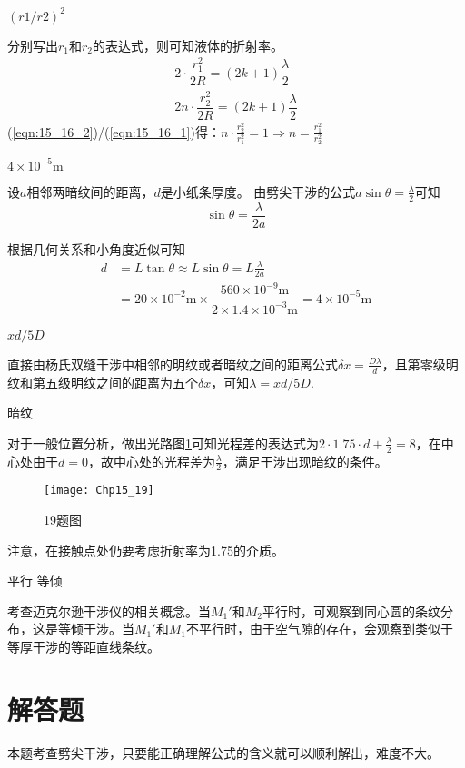 \exercise $(r1/r2)^2$

\solve 分别写出$r_1$和$r_2$的表达式，则可知液体的折射率。
\begin{gather}
	2\cdot\dfrac{r_1^2}{2R}=(2k+1)\dfrac{\lambda}{2}\label{eqn:15_16_1}\\
	2n\cdot\dfrac{r_2^2}{2R}=(2k+1)\dfrac{\lambda}{2}\label{eqn:15_16_2}
\end{gather}
(\ref{eqn:15_16_2})/(\ref{eqn:15_16_1})得：$n\cdot\frac{r_2^2}{r_1^2}=1\Rightarrow n=\frac{r_1^2}{r_2^2}$


\exercise $4\times10^{-5}\mathrm{m}$

\solve 设$a$相邻两暗纹间的距离，$d$是小纸条厚度。
由劈尖干涉的公式$a\sin\theta=\frac{\lambda}{2}$可知
\[
\sin\theta=\frac{\lambda}{2a}
\]

根据几何关系和小角度近似可知
\begin{align*}
d&=L\tan\theta\approx L\sin\theta=L\frac{\lambda}{2a}\\
&=20\times 10^{-2}\mathrm{m}\times \dfrac{560\times 10^{-9}\mathrm{m}}{2\times 1.4\times 10^{-3}\mathrm{m}}=4\times 10^{-5}\mathrm{m}
\end{align*}

\exercise $xd/5D$

\solve 直接由杨氏双缝干涉中相邻的明纹或者暗纹之间的距离公式$\delta x=\frac{D\lambda}{d}$，且第零级明纹和第五级明纹之间的距离为五个$\delta x$，可知$\lambda=xd/5D$.

\exercise 暗纹

\solve 对于一般位置分析，做出光路图\ref{fig:15_19}可知光程差的表达式为$2\cdot 1.75\cdot d+\frac{\lambda}{2}=8$，在中心处由于$d=0$，故中心处的光程差为$\frac{\lambda}{2}$，满足干涉出现暗纹的条件。
\begin{figure}[!h]
	\centering
	\texttt{[image: Chp15\_19]}
	\caption{19题图}\label{fig:15_19}
\end{figure}

注意，在接触点处仍要考虑折射率为1.75的介质。

\exercise 平行 等倾

\solve 考查迈克尔逊干涉仪的相关概念。当$M_1'$和$M_2$平行时，可观察到同心圆的条纹分布，这是等倾干涉。当$M_1'$和$M_1$不平行时，由于空气隙的存在，会观察到类似于等厚干涉的等距直线条纹。

\section{解答题}
\exercise 

\analysis
本题考查劈尖干涉，只要能正确理解公式的含义就可以顺利解出，难度不大。

